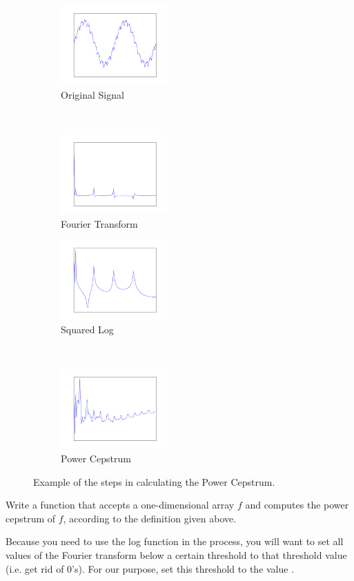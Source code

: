 \begin{figure}
\centering
\begin{subfigure}[t]{.4\textwidth}
\centering
\includegraphics[height=1.2in]{OriginalSignal.pdf}
\caption*{Original Signal}
\end{subfigure}
~
\begin{subfigure}[t]{.4\textwidth}
\centering
\includegraphics[height=1.2in]{FourierTransform.pdf}
\caption*{Fourier Transform}
\end{subfigure}

\begin{subfigure}[t]{.4\textwidth}
\centering
\includegraphics[height=1.2in]{SquaredLog.pdf}
\caption*{Squared Log}
\end{subfigure}
~
\begin{subfigure}[t]{.4\textwidth}
\centering
\includegraphics[height=1.2in]{PowerCepstrum.pdf}
\caption*{Power Cepstrum}
\end{subfigure}

\caption{Example of the steps in calculating the Power Cepstrum.}
\label{fourierext:pc}
\end{figure}

\begin{problem}
Write a function  that accepts a one-dimensional array $f$ and computes the
power cepstrum of $f$, according to the definition given above.

Because you need to use the log function in the process, you will want to set all values of the Fourier transform below a certain threshold to that threshold value (i.e. get rid of 0's).
For our purpose, set this threshold to the value .
\end{problem}

